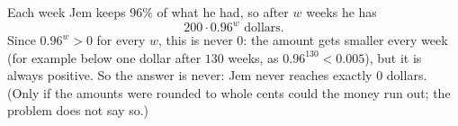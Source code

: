 Each week Jem keeps $96\%$ of what he had, so after $w$ weeks he has
\[
200\cdot0.96^w\text{ dollars}.
\]
Since $0.96^w>0$ for every $w$, this is never $0$: the amount gets smaller every week (for example below one dollar after $130$ weeks, as $0.96^{130}<0.005$), but it is always positive. So the answer is $\boxed{\text{never}}$: Jem never reaches exactly $0$ dollars. (Only if the amounts were rounded to whole cents could the money run out; the problem does not say so.)
